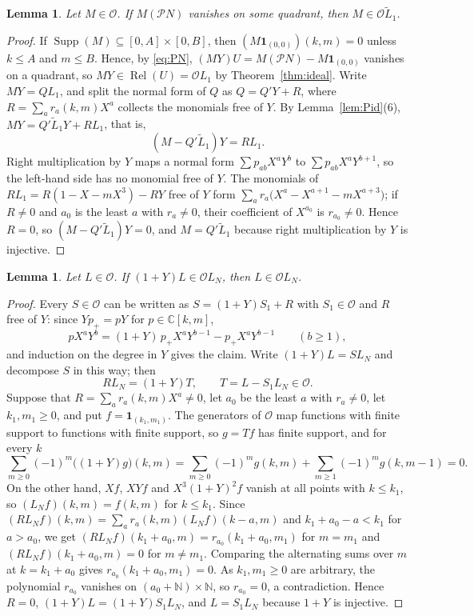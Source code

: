 \documentclass[11pt]{amsart}
\newtheorem{lemma}[theorem]{Lemma}
\theoremstyle{definition}
\newcommand{\C}{\mathbb{C}}
\newcommand{\NN}{\mathbb{N}}
\newcommand{\cO}{\mathcal{O}}
\DeclareMathOperator{\Rel}{Rel}
\DeclareMathOperator{\Supp}{Supp}
\begin{document}
\begin{lemma}\label{lem:relV}
Let $M\in\cO$. If $M(\mathcal PN)$ vanishes on some quadrant, then $M\in\cO\widetilde L_1$.
\end{lemma}

\begin{proof}
If $\Supp(M)\subseteq[0,A]\times[0,B]$, then $(M\mathbf 1_{(0,0)})(k,m)=0$ unless $k\le A$ and $m\le B$. Hence, by \eqref{eq:PN}, $(MY)U=M(\mathcal PN)-M\mathbf 1_{(0,0)}$ vanishes on a quadrant, so $MY\in\Rel(U)=\cO L_1$ by Theorem~\ref{thm:ideal}. Write $MY=QL_1$, and split the normal form of $Q$ as $Q=Q'Y+R$, where $R=\sum_ar_a(k,m)X^a$ collects the monomials free of $Y$. By Lemma~\ref{lem:Pid}(6), $MY=Q'\widetilde L_1Y+RL_1$, that is,
\[
  (M-Q'\widetilde L_1)Y=RL_1 .
\]
Right multiplication by $Y$ maps a normal form $\sum p_{ab}X^aY^b$ to $\sum p_{ab}X^aY^{b+1}$, so the left-hand side has no monomial free of $Y$. The monomials of $RL_1=R(1-X-mX^3)-RY$ free of $Y$ form $\sum_ar_a\bigl(X^a-X^{a+1}-mX^{a+3}\bigr)$; if $R\ne0$ and $a_0$ is the least $a$ with $r_a\ne0$, their coefficient of $X^{a_0}$ is $r_{a_0}\ne0$. Hence $R=0$, so $(M-Q'\widetilde L_1)Y=0$, and $M=Q'\widetilde L_1$ because right multiplication by $Y$ is injective.
\end{proof}

\begin{lemma}\label{lem:saturation}
Let $L\in\cO$. If $(1+Y)L\in\cO L_N$, then $L\in\cO L_N$.
\end{lemma}

\begin{proof}
Every $S\in\cO$ can be written as $S=(1+Y)S_1+R$ with $S_1\in\cO$ and $R$ free of $Y$: since $Yp_+=pY$ for $p\in\C[k,m]$,
\[
  pX^aY^b=(1+Y)\,p_+X^aY^{b-1}-p_+X^aY^{b-1}\qquad(b\ge1),
\]
and induction on the degree in $Y$ gives the claim. Write $(1+Y)L=SL_N$ and decompose $S$ in this way; then
\[
  RL_N=(1+Y)T,\qquad T=L-S_1L_N\in\cO .
\]
Suppose that $R=\sum_ar_a(k,m)X^a\ne0$, let $a_0$ be the least $a$ with $r_a\ne0$, let $k_1,m_1\ge0$, and put $f=\mathbf 1_{(k_1,m_1)}$. The generators of $\cO$ map functions with finite support to functions with finite support, so $g=Tf$ has finite support, and for every $k$
\[
  \sum_{m\ge0}(-1)^m\bigl((1+Y)g\bigr)(k,m)=\sum_{m\ge0}(-1)^mg(k,m)+\sum_{m\ge1}(-1)^mg(k,m-1)=0 .
\]
On the other hand, $Xf$, $XYf$ and $X^3(1+Y)^2f$ vanish at all points with $k\le k_1$, so $(L_Nf)(k,m)=f(k,m)$ for $k\le k_1$. Since $(RL_Nf)(k,m)=\sum_ar_a(k,m)(L_Nf)(k-a,m)$ and $k_1+a_0-a<k_1$ for $a>a_0$, we get $(RL_Nf)(k_1+a_0,m)=r_{a_0}(k_1+a_0,m_1)$ for $m=m_1$ and $(RL_Nf)(k_1+a_0,m)=0$ for $m\ne m_1$. Comparing the alternating sums over $m$ at $k=k_1+a_0$ gives $r_{a_0}(k_1+a_0,m_1)=0$. As $k_1,m_1\ge0$ are arbitrary, the polynomial $r_{a_0}$ vanishes on $(a_0+\NN)\times\NN$, so $r_{a_0}=0$, a contradiction. Hence $R=0$, $(1+Y)L=(1+Y)S_1L_N$, and $L=S_1L_N$ because $1+Y$ is injective.
\end{proof}
\end{document}
